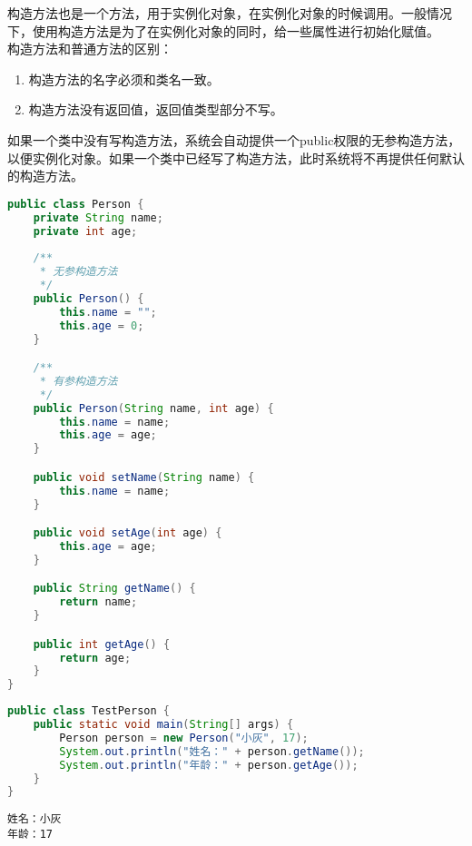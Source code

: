 构造方法也是一个方法，用于实例化对象，在实例化对象的时候调用。一般情况下，使用构造方法是为了在实例化对象的同时，给一些属性进行初始化赋值。\\

构造方法和普通方法的区别：

\begin{enumerate}
	\item 构造方法的名字必须和类名一致。
	\item 构造方法没有返回值，返回值类型部分不写。
\end{enumerate}

如果一个类中没有写构造方法，系统会自动提供一个public权限的无参构造方法，以便实例化对象。如果一个类中已经写了构造方法，此时系统将不再提供任何默认的构造方法。\\


\begin{lstlisting}[language=Java, title=Person.java]
public class Person {
    private String name;
    private int age;
    
    /**
     * 无参构造方法
     */
    public Person() {
        this.name = "";
        this.age = 0;
    }

    /**
     * 有参构造方法
     */
    public Person(String name, int age) {
        this.name = name;
        this.age = age;
    }

    public void setName(String name) {
        this.name = name;
    }

    public void setAge(int age) {
        this.age = age;
    }

    public String getName() {
        return name;
    }

    public int getAge() {
        return age;
    }
}
\end{lstlisting}

\begin{lstlisting}[language=Java, title=TestPerson.java]
public class TestPerson {
    public static void main(String[] args) {
        Person person = new Person("小灰", 17);
        System.out.println("姓名：" + person.getName());
        System.out.println("年龄：" + person.getAge());
    }
}
\end{lstlisting}

\begin{tcolorbox}
	\begin{verbatim}
姓名：小灰
年龄：17
	\end{verbatim}
\end{tcolorbox}

\newpage
